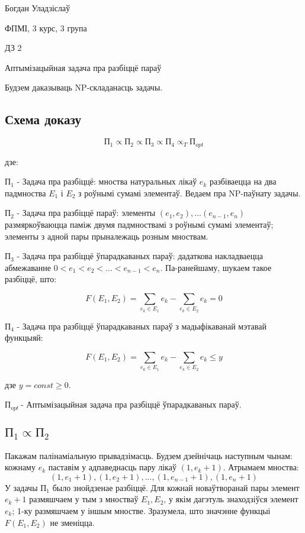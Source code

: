 \documentclass{article}
\newcommand{\opt}{${\text{П}}_{opt}\ $}
\begin{document}
{\large

Богдан Уладзіслаў

ФПМІ, 3 курс, 3 група

\vspace{5mm}

ДЗ 2

Аптымізацыйная задача пра разбіццё параў

}

\vspace{15mm}

Будзем даказываць NP-складанасць задачы.

\subsection*{Схема доказу}

\[
{\text{П}}_{1} \propto {\text{П}}_{2} \propto {\text{П}}_{3} \propto {\text{П}}_{4} \propto_{T} {\text{П}}_{opt}
\]

дзе:

${\text{П}}_{1}$ - Задача пра разбіццё: мноства натуральных лікаў $e_k$ разбіваецца на два
падмноства $E_1$ і $E_2$ з роўнымі сумамі элементаў. Ведаем пра NP-паўнату
задачы.

${\text{П}}_{2}$ - Задача пра разбіццё параў: элементы $(e_1, e_2), ... (e_{n-1}, e_n)$
размяркоўваюцца паміж двумя падмноствамі з роўнымі сумамі элементаў; элементы з
адной пары прыналежаць розным мноствам.

${\text{П}}_{3}$ - Задача пра разбіццё ўпарадкаваных параў: дадаткова накладваецца
абмежаванне $0 < e_1 < e_2 < ... < e_{n-1} < e_n$. Па-ранейшаму, шукаем такое
разбіццё, што:

\[
F(E_1, E_2) = \sum_{e_k \in E_1}{e_k} - \sum_{e_k \in E_2}{e_k} = 0
\]

${\text{П}}_{4}$ - Задача пра разбіццё ўпарадкаваных параў з мадыфікаванай мэтавай
функцыяй:

\[
F(E_1, E_2) = \sum_{e_k \in E_1}{e_k} - \sum_{e_k \in E_2}{e_k} \leq y
\]

дзе $y = const \geq 0$.

\opt - Аптымізацыйная задача пра разбіццё ўпарадкаваных параў.

\subsection*{${\text{П}}_{1} \propto {\text{П}}_{2}$}

Пакажам палінаміальную прывадзімасць. Будзем дзейнічаць наступным чынам:
кожнаму $e_k$ паставім у адпаведнасць пару лікаў $(1, e_k+1)$. Атрымаем мноства:
\[
    (1, e_1+1), (1, e_2+1), ... , (1, e_{n-1}+1), (1, e_n+1)
\]
У задачы ${\text{П}}_{1}$ было знойдзенае разбіццё. Для кожнай новаўтворанай
пары элемент $e_k+1$ размяшчаем у тым з мностваў $E_1, E_2$, у якім дагэтуль
знаходзіўся элемент $e_k$; 1-ку размяшчаем у іншым мностве. Зразумела, што
значэнне функцыі $F(E_1, E_2)$ не зменіцца.
\end{document}
